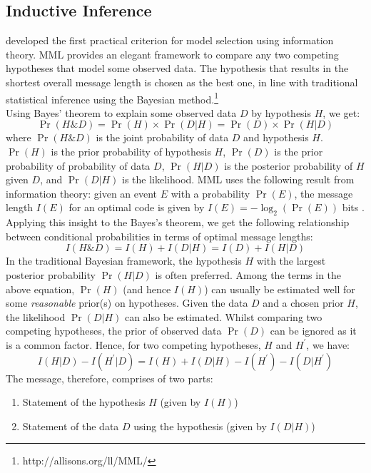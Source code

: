 \documentclass[wcp]{jmlr}
\begin{document}
\subsection{Inductive Inference}
\citet{wallace68} developed the first practical criterion for model selection using 
information theory. MML provides an elegant framework to compare any two competing 
hypotheses that model some observed data. The hypothesis that results in the shortest 
overall message length is chosen as the best one, in line with traditional statistical 
inference using the Bayesian method.\footnote{http://allisons.org/ll/MML/} \\

Using Bayes' theorem to explain some observed data $D$ by hypothesis $H$, we get:
\begin{equation*}
  \Pr(H\&D) = \Pr(H) \times \Pr(D|H) = \Pr(D) \times \Pr(H|D)
\end{equation*}
where $\Pr(H\&D)$ is the joint probability of data $D$ and hypothesis $H$. $\Pr(H)$
is the prior probability of hypothesis $H$, $\Pr(D)$ is the prior probability of 
probability of data $D$, $\Pr(H|D)$ is the posterior probability of $H$
given $D$, and $\Pr(D|H)$ is the likelihood.
MML uses the following result from information theory: given an event $E$
with a probability $\Pr(E)$, the message length $I(E)$ for an optimal
code is given by $I(E) = -\log_2 (\Pr(E))$ bits \citep{shannon1948}. Applying this insight
to the Bayes's theorem, we get the following relationship between
conditional probabilities in terms of optimal message lengths:
\begin{equation*}
  I(H\&D) = I(H) + I(D|H) = I(D) + I(H|D)
\end{equation*}
In the traditional Bayesian framework, the hypothesis $H$ with
the largest posterior probability $\Pr(H|D)$ is often preferred.
Among the terms in the above equation, $\Pr(H)$ (and hence $I(H)$) can
usually be estimated well for some \emph{reasonable} prior(s) on hypotheses.
Given the data $D$ and a chosen prior $H$, the likelihood $\Pr(D|H)$ can also be estimated.
Whilst comparing two competing hypotheses, the prior of observed data $\Pr(D)$
can be ignored as it is a common factor. Hence, for two competing hypotheses, $H$ and $H^\prime$, we have:
\begin{equation*}
I(H|D) - I(H^\prime|D) = I(H) + I(D|H) - I(H^\prime) - I(D|H^\prime)
\end{equation*}
The message, therefore, comprises of two parts: 
\begin{enumerate}
\item Statement of the hypothesis $H$ (given by $I(H)$)  
\item Statement of the data $D$ using the hypothesis (given by $I(D|H)$) 
\end{enumerate}
\end{document}
